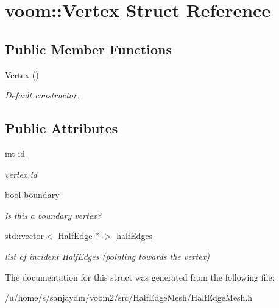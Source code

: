 \hypertarget{structvoom_1_1_vertex}{
\section{voom::Vertex Struct Reference}
\label{structvoom_1_1_vertex}
}
\subsection*{Public Member Functions}
\begin{DoxyCompactItemize}
\item 
\hypertarget{structvoom_1_1_vertex_ac57248e30b30e3b18f0e18399507e7a1}{
\hyperlink{structvoom_1_1_vertex_ac57248e30b30e3b18f0e18399507e7a1}{Vertex} ()}
\label{structvoom_1_1_vertex_ac57248e30b30e3b18f0e18399507e7a1}

\begin{DoxyCompactList}\small\item\em Default constructor. \item\end{DoxyCompactList}\end{DoxyCompactItemize}
\subsection*{Public Attributes}
\begin{DoxyCompactItemize}
\item 
\hypertarget{structvoom_1_1_vertex_ac8c8d049579ef13469f7ff952c99ae00}{
int \hyperlink{structvoom_1_1_vertex_ac8c8d049579ef13469f7ff952c99ae00}{id}}
\label{structvoom_1_1_vertex_ac8c8d049579ef13469f7ff952c99ae00}

\begin{DoxyCompactList}\small\item\em vertex id \item\end{DoxyCompactList}\item 
\hypertarget{structvoom_1_1_vertex_a3843e606fdddcfcc6e1bc2c4afb69906}{
bool \hyperlink{structvoom_1_1_vertex_a3843e606fdddcfcc6e1bc2c4afb69906}{boundary}}
\label{structvoom_1_1_vertex_a3843e606fdddcfcc6e1bc2c4afb69906}

\begin{DoxyCompactList}\small\item\em is this a boundary vertex? \item\end{DoxyCompactList}\item 
\hypertarget{structvoom_1_1_vertex_a7b056c3ef2e8c89d7f50271c04e8e88b}{
std::vector$<$ \hyperlink{structvoom_1_1_half_edge}{HalfEdge} $\ast$ $>$ \hyperlink{structvoom_1_1_vertex_a7b056c3ef2e8c89d7f50271c04e8e88b}{halfEdges}}
\label{structvoom_1_1_vertex_a7b056c3ef2e8c89d7f50271c04e8e88b}

\begin{DoxyCompactList}\small\item\em list of incident HalfEdges (pointing towards the vertex) \item\end{DoxyCompactList}\end{DoxyCompactItemize}


The documentation for this struct was generated from the following file:\begin{DoxyCompactItemize}
\item 
/u/home/s/sanjaydm/voom2/src/HalfEdgeMesh/HalfEdgeMesh.h\end{DoxyCompactItemize}
